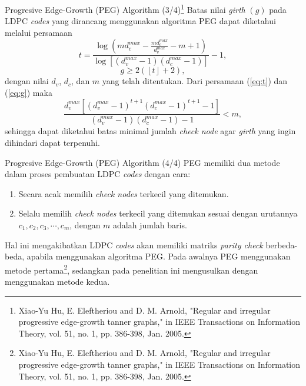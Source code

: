 \documentclass[11pt, aspectratio=169]{beamer}
\begin{document}
\begin{frame}{Progresive Edge-Growth (PEG) Algorithm (3/4)\footnote[1]{\tiny Xiao-Yu Hu, E. Eleftheriou and D. M. Arnold, "Regular and irregular progressive edge-growth tanner graphs," in IEEE Transactions on Information Theory, vol. 51, no. 1, pp. 386-398, Jan. 2005.
	}}
\vspace{-0.2cm}
	Batas nilai \textit{girth} $(g)$ pada LDPC \textit{codes} yang dirancang menggunakan algoritma PEG dapat diketahui melalui persamaan 
	\begin{equation}
	t=\frac{\log\left ( md_c^{max}- \frac{md_c^{max}}{d_v^{max}} - m +1 \right )}{\log\left [ \left ( d_v^{max} -1  \right ) \left ( d_c^{max} -1  \right ) \right ]}-1,
	\label{eq:t}
	\end{equation}
	\begin{equation}
		g \geq 2 \left (\left \lfloor t \right \rfloor +2 \right ),
		\label{eq:g}
	\end{equation}
	dengan nilai $d_v$, $d_c$, dan $m$ yang telah ditentukan. Dari persamaan (\ref{eq:t}) dan (\ref{eq:g}) maka
	\begin{equation}
	\frac{d_v^{max}\left [  \left ( d_v^{max}-1 \right )^{t+1} \left ( d_c^{max}-1 \right )^{t+1} -1\right ]}{\left ( d_v^{max}-1 \right ) \left ( d_c^{max}-1 \right )-1}<m,
	\end{equation}
	sehingga dapat diketahui batas minimal jumlah \textit{check node} agar \textit{girth} yang ingin dihindari dapat terpenuhi.
\end{frame}



\begin{frame}{Progresive Edge-Growth (PEG) Algorithm (4/4)}
	PEG memiliki dua metode dalam proses pembuatan LDPC \textit{codes} dengan cara:
	\begin{enumerate}
		\item Secara acak memilih \textit{check nodes} terkecil yang ditemukan.
		\item Selalu memilih \textit{check nodes} terkecil yang ditemukan sesuai dengan urutannya $c_1, c_2, c_3, \cdots, c_{m}$, dengan $m$ adalah jumlah baris.
	\end{enumerate}
	Hal ini mengakibatkan LDPC \textit{codes} akan memiliki matriks \textit{parity check} berbeda-beda, apabila menggunakan algoritma PEG. Pada awalnya PEG menggunakan metode pertama\footnote[1]{\tiny Xiao-Yu Hu, E. Eleftheriou and D. M. Arnold, "Regular and irregular progressive edge-growth tanner graphs," in IEEE Transactions on Information Theory, vol. 51, no. 1, pp. 386-398, Jan. 2005.}, sedangkan pada penelitian ini mengusulkan dengan menggunakan metode kedua.

\end{frame}
\end{document}
